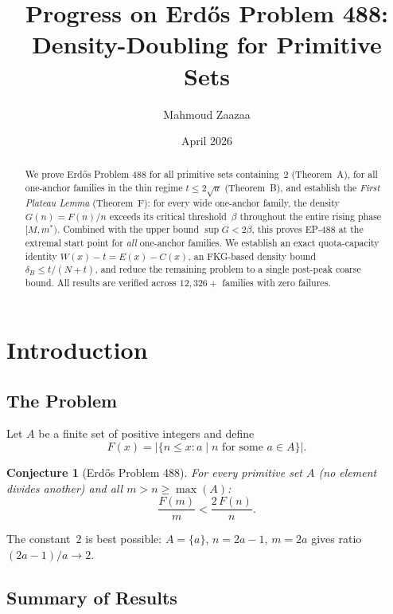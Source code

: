 \documentclass[11pt,a4paper]{article}
\title{Progress on Erd\H{o}s Problem 488:\\Density-Doubling for Primitive Sets}
\author{Mahmoud Zaazaa}
\date{April 2026}
\newtheorem{conjecture}[theorem]{Conjecture}
\theoremstyle{definition}
\begin{document}
\maketitle

\begin{abstract}
We prove Erd\H{o}s Problem 488 for all primitive sets containing~$2$
(Theorem~A), for all one-anchor families in the thin regime
$t \leq 2\sqrt{a}$ (Theorem~B), and establish the \emph{First Plateau
Lemma} (Theorem~F): for every wide one-anchor family, the density
$G(n) = F(n)/n$ exceeds its critical threshold~$\beta$ throughout the
entire rising phase $[M, m^*)$. Combined with the upper bound
$\sup G < 2\beta$, this proves EP-488 at the extremal start point for
\emph{all} one-anchor families. We establish an exact quota-capacity
identity $W(x) - t = E(x) - C(x)$, an FKG-based density bound
$\delta_B \leq t/(N+t)$, and reduce the remaining problem to a single
post-peak coarse bound. All results are verified across $12{,}326+$
families with zero failures.
\end{abstract}

\tableofcontents
\newpage

\section{Introduction}

\subsection{The Problem}

Let $A$ be a finite set of positive integers and define
\[
F(x) = \bigl|\{n \leq x : a \mid n \text{ for some } a \in A\}\bigr|.
\]

\begin{conjecture}[Erd\H{o}s Problem 488]
For every primitive set $A$ (no element divides another) and all
$m > n \geq \max(A)$:
\[
\frac{F(m)}{m} < \frac{2\,F(n)}{n}.
\]
\end{conjecture}

The constant~$2$ is best possible: $A = \{a\}$, $n = 2a-1$, $m = 2a$
gives ratio $(2a-1)/a \to 2$.

\subsection{Summary of Results}
\end{document}
